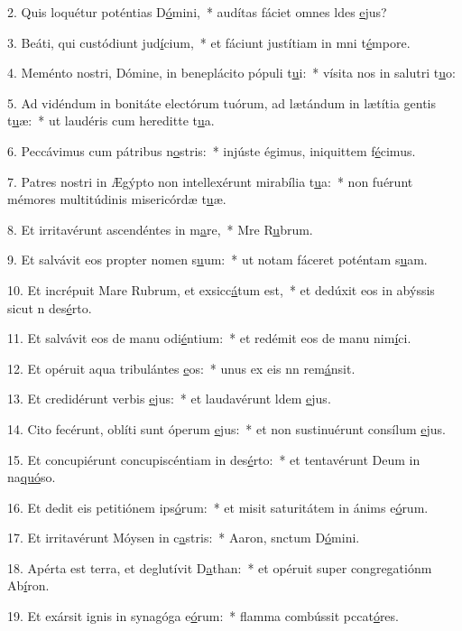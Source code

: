2. Quis loquétur poténtias D\uline{ó}mini,~* audítas fáciet omnes ldes \uline{e}jus?\par 
3. Beáti, qui custódiunt jud\uline{í}cium,~* et fáciunt justítiam in mni t\uline{é}mpore.\par 
4. Meménto nostri, Dómine, in beneplácito pópuli t\uline{u}i:~* vísita nos in salutri t\uline{u}o:\par 
5. Ad vidéndum in bonitáte electórum tuórum, ad lætándum in lætítia gentis t\uline{u}æ:~* ut laudéris cum hereditte t\uline{u}a.\par 
6. Peccávimus cum pátribus n\uline{o}stris:~* injúste égimus, iniquittem f\uline{é}cimus.\par 
7. Patres nostri in Ægýpto non intellexérunt mirabília t\uline{u}a:~* non fuérunt mémores multitúdinis misericórdæ t\uline{u}æ.\par 
8. Et irritavérunt ascendéntes in m\uline{a}re,~* Mre R\uline{u}brum.\par 
9. Et salvávit eos propter nomen s\uline{u}um:~* ut notam fáceret poténtam s\uline{u}am.\par 
10. Et incrépuit Mare Rubrum, et exsicc\uline{á}tum est,~* et dedúxit eos in abýssis sicut n des\uline{é}rto.\par 
11. Et salvávit eos de manu odi\uline{é}ntium:~* et redémit eos de manu nim\uline{í}ci.\par 
12. Et opéruit aqua tribulántes \uline{e}os:~* unus ex eis nn rem\uline{á}nsit.\par 
13. Et credidérunt verbis \uline{e}jus:~* et laudavérunt ldem \uline{e}jus.\par 
14. Cito fecérunt, oblíti sunt óperum \uline{e}jus:~* et non sustinuérunt consílum \uline{e}jus.\par 
15. Et concupiérunt concupiscéntiam in des\uline{é}rto:~* et tentavérunt Deum in na\uline{quó}so.\par 
16. Et dedit eis petitiónem ips\uline{ó}rum:~* et misit saturitátem in ánims e\uline{ó}rum.\par 
17. Et irritavérunt Móysen in c\uline{a}stris:~* Aaron, snctum D\uline{ó}mini.\par 
18. Apérta est terra, et deglutívit D\uline{a}than:~* et opéruit super congregatiónm Ab\uline{í}ron.\par 
19. Et exársit ignis in synagóga e\uline{ó}rum:~* flamma combússit pccat\uline{ó}res.\par 
